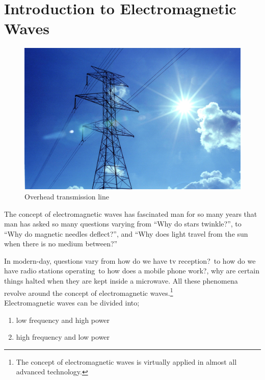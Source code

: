 \chapter{Introduction to Electromagnetic Waves}
\begin{figure}[h]
\centering
\includegraphics[width=1\linewidth]{./graphics/transmission1}
\caption{Overhead transmission line}
\end{figure}


The concept of electromagnetic waves has fascinated man for so many years that man has asked so many questions varying from \textquotedblleft Why do stars twinkle?\textquotedblright, to \textquotedblleft Why do magnetic needles deflect?\textquotedblright, and   \textquotedblleft Why does light travel from the sun when there is no medium between?\textquotedblright \newline

In modern-day, questions vary from \textquotesingle\textquotesingle how do we have tv reception?\textquotesingle\textquotesingle\ to \textquotesingle\textquotesingle how do we have radio stations operating\textquotesingle\textquotesingle\ to \textquotesingle\textquotesingle how does a mobile phone work?\textquotesingle\textquotesingle, \textquotesingle\textquotesingle why are certain things halted when they are kept inside a microwave\textquotesingle\textquotesingle. All these phenomena revolve around the concept of electromagnetic waves.\footnote{The concept of electromagnetic waves is virtually applied in almost all advanced technology.}\\

Electromagnetic waves can be divided into;
\begin{enumerate}
\item low frequency and high power
\item high frequency and low power
\end{enumerate}


